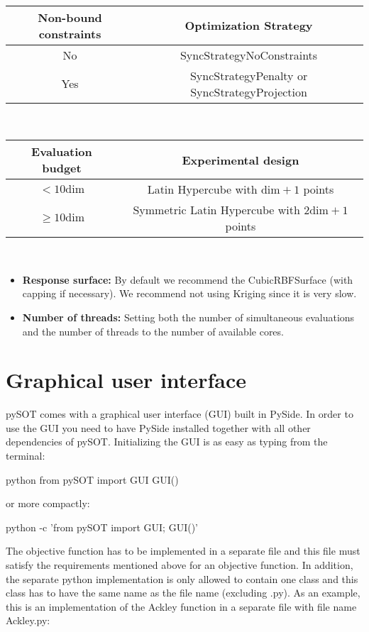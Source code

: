 \documentclass[]{article}
\begin{document}
\ \newline

\begin{center}
\begin{tabular}{ c | c }
  \hline			
Non-bound constraints & Optimization Strategy \\
  \hline  
  No & SyncStrategyNoConstraints \\
  Yes & SyncStrategyPenalty or SyncStrategyProjection \\
  \hline
\end{tabular}
\end{center}

\ \newline

\begin{center}
\begin{tabular}{ c | c }
  \hline			
Evaluation budget & Experimental design \\
  \hline  
  $< 10 \text{dim}$ & Latin Hypercube with $\text{dim}+1$ points \\
  $\geq 10 \text{dim}$ & Symmetric Latin Hypercube with $2\text{dim}+1$ points \\
  \hline
\end{tabular}
\end{center}

\ \newline

\begin{itemize}
\item \textbf{Response surface:} By default we recommend the CubicRBFSurface (with capping if necessary). We recommend not using Kriging since it is very slow.
\item \textbf{Number of threads:}  Setting both the number of simultaneous evaluations and the number of threads to the number of available cores.
\end{itemize}

\section{Graphical user interface}
pySOT comes with a graphical user interface (GUI) built in PySide. In order to use the GUI you need to have PySide installed together with all other dependencies of pySOT. Initializing the GUI is as easy as typing from the terminal:
\begin{python}
python
from pySOT import GUI
GUI()
\end{python} 
or more compactly:
\begin{python}
python -c 'from pySOT import GUI; GUI()'
\end{python}
The objective function has to be implemented in a separate file and this file must satisfy the requirements mentioned above for an objective function. In addition, the separate python implementation is only allowed to contain one class and this class has to have the same name as the file name (excluding .py). As an example, this is an implementation of the Ackley function in a separate file with file name Ackley.py:
\end{document}
